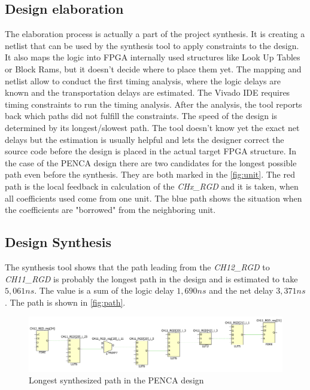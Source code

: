 \subsection{Design elaboration}
The elaboration process is actually a part of the project synthesis. It is creating a netlist that can be used by the synthesis tool to apply constraints to the design. It also maps the logic into FPGA internally used structures like Look Up Tables or Block Rams, but it doesn't decide where to place them yet. The mapping and netlist allow to conduct the first timing analysis, where the logic delays are known and the transportation delays are estimated. The Vivado IDE requires timing constraints to run the timing analysis. After the analysis, the tool reports back which paths did not fulfill the constraints. The speed of the design is determined by its longest/slowest path. The tool doesn't know yet the exact net delays but the estimation is usually helpful and lets the designer correct the source code before the design is placed in the actual target FPGA structure. In the case of the PENCA design there are two candidates for the longest possible path even before the synthesis. They are both marked in the \autoref{fig:unit}. The red path is the local feedback in calculation of the \textit{CHx\_RGD} and it is taken, when all coefficients used come from one unit. The blue path shows the situation when the coefficients are "borrowed" from the neighboring unit.
\subsection{Design Synthesis}
The synthesis tool shows that the path leading from the \textit{CH12\_RGD} to \textit{CH11\_RGD} is probably the longest path in the design and is estimated to take $5,061 ns$. The value is a sum of the logic delay $1,690 ns$ and the net delay $3,371 ns$. The path is shown in \autoref{fig:path}.

\begin{figure}[h]
\centering
\includegraphics[width=\textwidth]{figures/path.png}
\caption{Longest synthesized path in the PENCA design}
\label{fig:path}
\end{figure}

